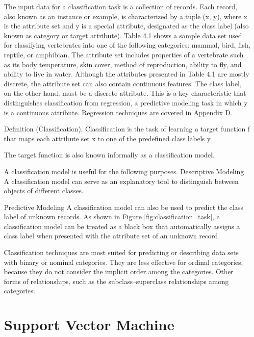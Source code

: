 \FloatBarrier

The input data for a classification task is a collection of records. Each record, also known as an instance or example, is characterized by a tuple (x, y), where x is the attribute set and y is a special attribute, designated as the class label (also known as category or target attribute). Table 4.1 shows a sample data set used for classifying vertebrates into one of the following categories: mammal, bird, fish, reptile, or amphibian. The attribute set includes properties of a vertebrate such as its body temperature, skin cover, method of reproduction, ability to fly, and ability to live in water. Although the attributes presented in Table 4.1 are mostly discrete, the attribute set can also contain continuous features. The class label, on the other hand, must be a discrete attribute. This is a key characteristic that distinguishes classification from regression, a predictive modeling task in which y is a continuous attribute. Regression techniques are covered in Appendix D.

Definition (Classification). Classification is the task of learning a target function f that maps each attribute set x to one of the predefined class labels y.

The target function is also known informally as a classification model.

A classification model is useful for the following purposes.
Descriptive Modeling A classification model can serve as an explanatory tool to distinguish between objects of different classes.

Predictive Modeling A classification model can also be used to predict the class label of unknown records. As shown in Figure \ref{fig:classification_task}, a classification model can be treated as a black box that automatically assigns a class label when presented with the attribute set of an unknown record.

Classification techniques are most suited for predicting or describing data sets with binary or nominal categories. They are less effective for ordinal categories, because they do not consider the implicit order among the categories. Other forms of relationships, such as the subclass–superclass relationships among categories.

\section{Support Vector Machine}

